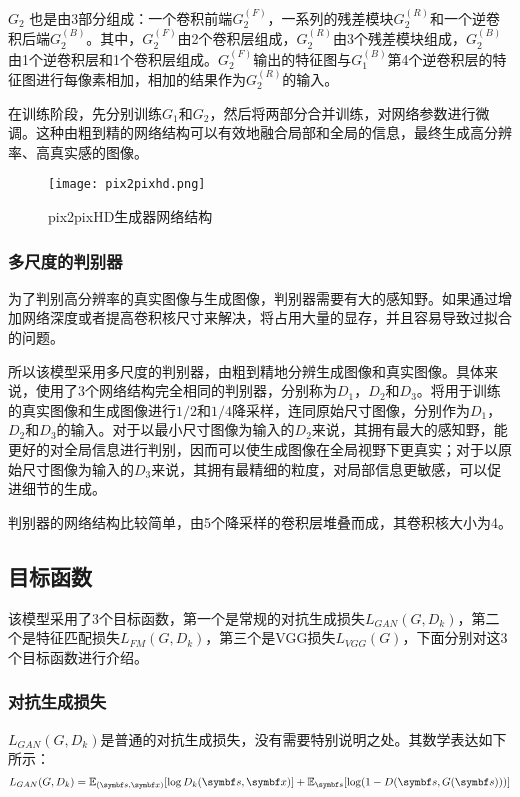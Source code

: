 $G_2$ 也是由3部分组成：一个卷积前端$G_2^{(F)}$，一系列的残差模块$G_2^{(R)}$和一个逆卷积后端$G_2^{(B)}$。其中，$G_2^{(F)}$由2个卷积层组成，$G_2^{(R)}$由3个残差模块组成，$G_2^{(B)}$由1个逆卷积层和1个卷积层组成。$G_2^{(F)}$输出的特征图与$G_1^{(B)}$第4个逆卷积层的特征图进行每像素相加，相加的结果作为$G_2^{(R)}$的输入。

在训练阶段，先分别训练$G_1$和$G_2$，然后将两部分合并训练，对网络参数进行微调。这种由粗到精的网络结构可以有效地融合局部和全局的信息，最终生成高分辨率、高真实感的图像。
\begin{figure}[htb]
	\centering
	\texttt{[image: pix2pixhd.png]}
	\caption{pix2pixHD生成器网络结构}
	\label{fig:pix2pixHD}
\end{figure}


\subsubsection{多尺度的判别器}

为了判别高分辨率的真实图像与生成图像，判别器需要有大的感知野。如果通过增加网络深度或者提高卷积核尺寸来解决，将占用大量的显存，并且容易导致过拟合的问题。

所以该模型采用多尺度的判别器，由粗到精地分辨生成图像和真实图像。具体来说，使用了3个网络结构完全相同的判别器，分别称为$D_1$，$D_2$和$D_3$。将用于训练的真实图像和生成图像进行$1/2$和$1/4$降采样，连同原始尺寸图像，分别作为$D_1$，$D_2$和$D_3$的输入。对于以最小尺寸图像为输入的$D_2$来说，其拥有最大的感知野，能更好的对全局信息进行判别，因而可以使生成图像在全局视野下更真实；对于以原始尺寸图像为输入的$D_3$来说，其拥有最精细的粒度，对局部信息更敏感，可以促进细节的生成。

判别器的网络结构比较简单，由5个降采样的卷积层堆叠而成，其卷积核大小为4。

\subsection{目标函数}

该模型采用了3个目标函数，第一个是常规的对抗生成损失$L_{GAN}(G,D_k)$，第二个是特征匹配损失$L_{FM}(G,D_k)$，第三个是VGG损失$L_{VGG}(G)$，下面分别对这3个目标函数进行介绍。

\subsubsection{对抗生成损失}

$L_{GAN}(G,D_k)$是普通的对抗生成损失，没有需要特别说明之处。其数学表达如下所示：
\begin{equation}
	L_{GAN}(G,D_k) = \mathbb{E}_{(\vs,\vx)}[\log D_k(\vs,\vx)]+\mathbb{E}_\vs[\log (1-D(\vs,G(\vs)))]
\end{equation}

